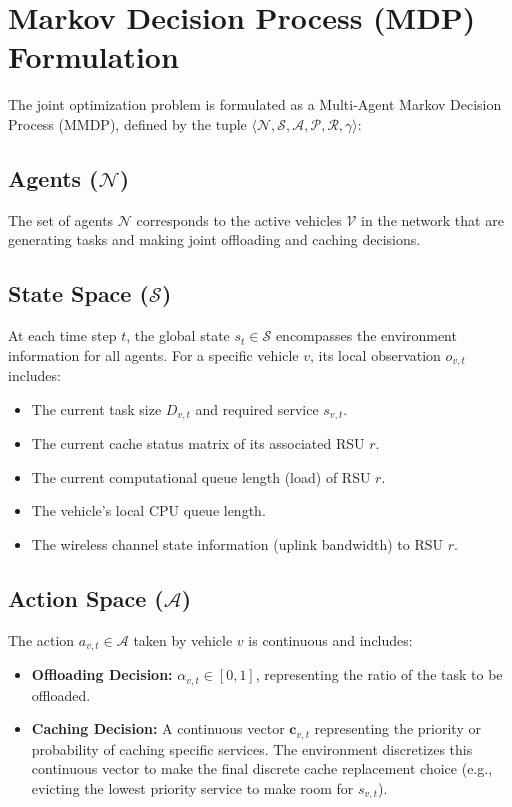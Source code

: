 \documentclass[12pt,a4paper]{report}
\begin{document}
\section{Markov Decision Process (MDP) Formulation}
The joint optimization problem is formulated as a Multi-Agent Markov Decision Process (MMDP), defined by the tuple $\langle \mathcal{N}, \mathcal{S}, \mathcal{A}, \mathcal{P}, \mathcal{R}, \gamma \rangle$:

\subsection{Agents ($\mathcal{N}$)}
The set of agents $\mathcal{N}$ corresponds to the active vehicles $\mathcal{V}$ in the network that are generating tasks and making joint offloading and caching decisions.

\subsection{State Space ($\mathcal{S}$)}
At each time step $t$, the global state $s_t \in \mathcal{S}$ encompasses the environment information for all agents. For a specific vehicle $v$, its local observation $o_{v,t}$ includes:
\begin{itemize}
    \item The current task size $D_{v,t}$ and required service $s_{v,t}$.
    \item The current cache status matrix of its associated RSU $r$.
    \item The current computational queue length (load) of RSU $r$.
    \item The vehicle's local CPU queue length.
    \item The wireless channel state information (uplink bandwidth) to RSU $r$.
\end{itemize}

\subsection{Action Space ($\mathcal{A}$)}
The action $a_{v,t} \in \mathcal{A}$ taken by vehicle $v$ is continuous and includes:
\begin{itemize}
    \item \textbf{Offloading Decision:} $\alpha_{v,t} \in [0, 1]$, representing the ratio of the task to be offloaded.
    \item \textbf{Caching Decision:} A continuous vector $\boldsymbol{c}_{v,t}$ representing the priority or probability of caching specific services. The environment discretizes this continuous vector to make the final discrete cache replacement choice (e.g., evicting the lowest priority service to make room for $s_{v,t}$).
\end{itemize}
\end{document}
